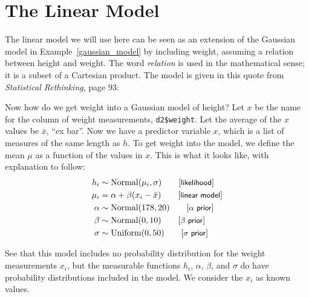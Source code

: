 \documentclass[
twoside=true,
paper=letter,
fontsize=11pt,
pagesize=auto,
leqno,
openany,
headsepline,
overfullrule,
]{scrbook}
\makeatletter
\newcommand{\reqnomode}{\tagsleft@false}
\theoremstyle{plain}
\theoremstyle{plain}
\theoremstyle{definition}
\theoremstyle{bfnoteitalic}
\theoremstyle{bfnoteroman}
\makeatother
\begin{document}
\section{The Linear Model}\label{linear_model}
The linear model we will use here can be seen as an extension of the Gaussian model in
Example~\ref{gaussian_model} by including weight, assuming a relation between height and weight.  The word  \emph{relation} is used  in the mathematical sense; it is a subset of a Cartesian product.
The model is given in this quote from \textsl{Statistical Rethinking}, page 93:
\begin{quoting}\small
Now how do we get weight into a Gaussian model of height? Let $x$ be the name for the
column of weight measurements, \texttt{d2\$weight}.
Let the average of the $x$ values be $\bar x$, ``ex bar''.
Now we have a predictor variable $x$, which is a list of measures of the same length as $h$. To get
weight into the model, we define the mean $\mu$ as a function of the values in $x$. This is what it
looks like, with explanation to follow:\reqnomode
\begin{align*}
h_i    & \sim \text{Normal}(\mu_i,\sigma) \tag*{[\textsf{\small likelihood}]}    \\
\mu_i  & = \alpha + \beta(x_i - \bar x)   \tag*{[\textsf{\small linear model}]}  \\
\alpha & \sim \text{Normal}(178,20)       \tag*{[\textsf{\small $\alpha$ prior}]}\\  
\beta  & \sim \text{Normal}(0,10)         \tag*{[\textsf{\small $\beta$ prior}]}   \\
\sigma & \sim \text{Uniform}(0,50)        \tag*{[\textsf{\small $\sigma$ prior}]} \\
\end{align*}
\end{quoting}
See that this model includes no probability distribution for the weight measurements $x_i$, but the measurable functions $h_i$, $\alpha$, $\beta$, and $\sigma$ do have probability distributions included in the model. We consider the $x_i$ as known values.
\end{document}
